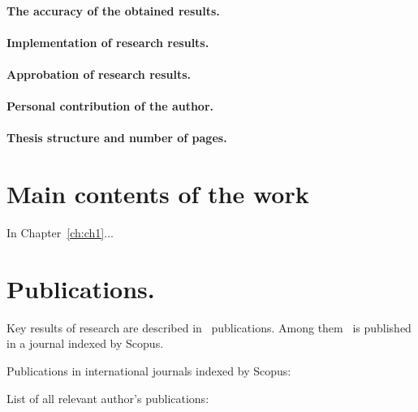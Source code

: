 \paragraph*{The accuracy of the obtained results.}

\paragraph*{Implementation of research results.}
\paragraph*{Approbation of research results.}
\paragraph*{Personal contribution of the author.}
\paragraph*{Thesis structure and number of pages.}

\newpage
\section*{Main contents of the work}

In Chapter~\ref{ch:ch1}...

\section*{Publications.}

Key results of research are described in \theAllMyPapers~publications. 
Among them
\theScopusPapers~is published in a journal indexed by Scopus. 



Publications in international journals indexed by Scopus:
\begin{refsection}
\nocite{*}
\printbibliography[
    keyword=scopus,
    heading=none,
    resetnumbers=true
]
\end{refsection}


List of all relevant author's publications:
\begin{refsection}
\nocite{*}
\printbibliography[
    keyword=own,
    heading=none,
    resetnumbers=true
]
\end{refsection}
